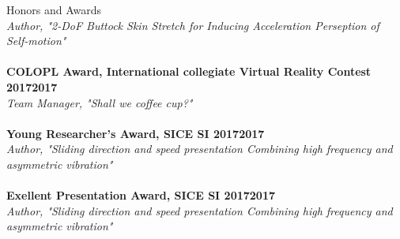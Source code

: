 \documentclass{resume} %
\begin{document}
\begin{rSection}{Honors and Awards}
\\{\em Author, "2-DoF Buttock Skin Stretch for Inducing Acceleration Perseption of Self-motion"} \\
\vspace{-3mm}
\\{\bf COLOPL Award, International collegiate Virtual Reality Contest 2017}\hfill {\bf 2017}
\\{\em Team Manager, "Shall we coffee cup?"} \\
\vspace{-3mm}
\\{\bf Young Researcher's Award, SICE SI 2017}\hfill {\bf 2017}
\\{\em Author, "Sliding direction and speed presentation Combining high frequency and asymmetric vibration"} \\
\vspace{-3mm}
\\{\bf Exellent Presentation Award, SICE SI 2017}\hfill {\bf 2017}
\\{\em Author, "Sliding direction and speed presentation
Combining high frequency and asymmetric vibration"} \\
\vspace{-3mm}


\end{rSection}
\end{document}
